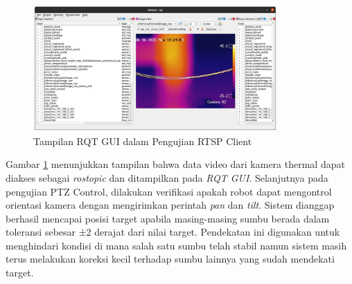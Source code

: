 \begin{figure}[H]
	\centering
	\includegraphics[width=0.83\textwidth]{gambar/bab4/test_rtsp.jpeg}
	\caption{Tampilan RQT GUI dalam Pengujian RTSP Client}
	\label{fig:rtsp_client} 
\end{figure}

Gambar \ref{fig:rtsp_client} menunjukkan tampilan bahwa data video dari kamera thermal dapat diakses sebagai \emph{rostopic} dan ditampilkan pada \emph{RQT GUI}. Selanjutnya pada pengujian PTZ Control, dilakukan verifikasi apakah robot dapat mengontrol orientasi kamera dengan mengirimkan perintah \emph{pan} dan \emph{tilt}.
Sistem dianggap berhasil mencapai posisi target apabila masing-masing sumbu berada
dalam toleransi sebesar ±2 derajat dari nilai target. Pendekatan ini digunakan
untuk menghindari kondisi di mana salah satu sumbu telah stabil namun sistem
masih terus melakukan koreksi kecil terhadap sumbu lainnya yang sudah mendekati
target. 

